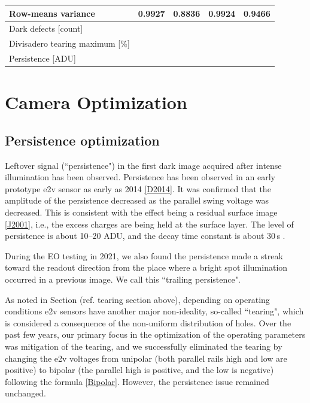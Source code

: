 \begin{table}[H]
\begin{tabular}{|l|ll|ll|}
Row-means variance                  & \multicolumn{1}{l|}{0.9927}    & 0.8836    & \multicolumn{1}{l|}{0.9924}    & 0.9466     \\ \hline
Dark defects {[}count{]}            & \multicolumn{1}{l|}{}          &           & \multicolumn{1}{l|}{}          &            \\ \hline
Divisadero tearing maximum {[}\%{]} & \multicolumn{1}{l|}{}          &           & \multicolumn{1}{l|}{}          &            \\ \hline
Persistence {[}ADU{]}               & \multicolumn{1}{l|}{}          &           & \multicolumn{1}{l|}{}          &            \\ \hline
\end{tabular}
\end{table}


\section{Camera Optimization}\label{camera-optimization}

\subsection{Persistence optimization}\label{sec:persistence-optimization}

Leftover signal (``persistence") in the first dark image acquired after intense illumination has
been observed.  Persistence has been observed
in an early prototype e2v sensor as early as 2014
\hyperref[D2014]{{[}D2014{]}}. It was confirmed that the amplitude of
the persistence decreased as the parallel swing voltage was decreased.
This is consistent with the effect being a residual surface image
\hyperref[J2001]{{[}J2001{]}}, i.e., the excess charges are being held
at the surface layer. The level of persistence is about 10--20 ADU,
and the decay time constant is about 30\,s
\citep{dmtn-276}.

During the EO testing in 2021, we also found the persistence made a
streak toward the readout direction from the place where a bright spot illumination occurred 
in a previous image. We call this ``trailing persistence".

As noted in Section (ref. tearing section above), depending on operating conditions e2v sensors have another major non-ideality, so-called ``tearing", which is
considered a consequence of the non-uniform distribution of holes. Over the past few years, our
primary focus in the optimization of the operating parameters was mitigation of the tearing, and we successfully eliminated the tearing by changing the
e2v voltages from unipolar (both parallel rails high and low
are positive) to bipolar (the parallel high is positive, and
the low is negative) following the formula
\hyperref[Bipolar]{{[}Bipolar{]}}. However, the persistence issue
remained unchanged.

